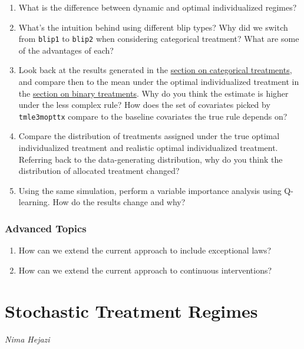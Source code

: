 \documentclass[12pt, krantz2,]{book}
\theoremstyle{definition}
\theoremstyle{definition}
\theoremstyle{definition}
\newcommand{\1}{\mathbbm{1}}
\begin{document}
\begin{enumerate}
\def\labelenumi{\arabic{enumi}.}
\item
  What is the difference between dynamic and optimal individualized regimes?
\item
  What's the intuition behind using different blip types? Why did we switch
  from \texttt{blip1} to \texttt{blip2} when considering categorical treatment? What are some
  of the advantages of each?
\item
  Look back at the results generated in the \protect\hyperlink{oit-eval-cat}{section on categorical
  treatments}, and compare then to the mean under the optimal
  individualized treatment in the \protect\hyperlink{oit-eval-bin}{section on binary
  treatments}. Why do you think the estimate is higher under the
  less complex rule? How does the set of covariates picked by \texttt{tmle3mopttx}
  compare to the baseline covariates the true rule depends on?
\item
  Compare the distribution of treatments assigned under the true optimal
  individualized treatment and realistic optimal individualized treatment.
  Referring back to the data-generating distribution, why do you think the
  distribution of allocated treatment changed?
\item
  Using the same simulation, perform a variable importance analysis using
  Q-learning. How do the results change and why?
\end{enumerate}

\hypertarget{advanced-topics-1}{%
\subsection{Advanced Topics}\label{advanced-topics-1}}

\begin{enumerate}
\def\labelenumi{\arabic{enumi}.}
\item
  How can we extend the current approach to include exceptional laws?
\item
  How can we extend the current approach to continuous interventions?
\end{enumerate}

\hypertarget{stochastic-treatment-regimes}{%
\chapter{Stochastic Treatment Regimes}\label{stochastic-treatment-regimes}}

\emph{Nima Hejazi}
\end{document}
